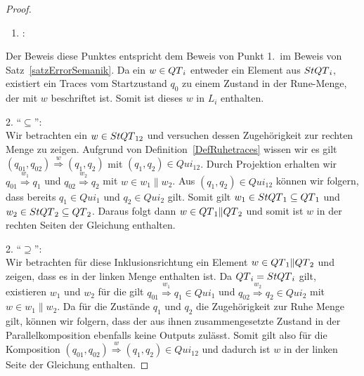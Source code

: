 \begin{proof}
  ~
  \begin{enumerate}
    \item \hspace{-0.2cm}:
  \end{enumerate}
  \vspace{-0.3cm}
  Der Beweis diese Punktes entspricht dem Beweis von Punkt 1.\ im Beweis von
  Satz~\ref{satzErrorSemanik}. Da ein $w\in QT{}_i$ entweder ein Element aus
  $StQT{}_i$, existiert ein Traces vom Startzustand $q_0$ zu einem Zustand in
  der Rune-Menge, der mit $w$ beschriftet ist. Somit ist dieses $w$ in $L_i$
  enthalten.

  2. ``$\subseteq$'':\\
  Wir betrachten ein
  $w\in StQT{}_{12}$ und versuchen dessen Zugehörigkeit zur rechten Menge zu
  zeigen. Aufgrund von Definition~\ref{DefRuhetraces} wissen wir es gilt
  $(q_{01},q_{02}) \overset{w}{\Rightarrow} (q_1,q_2)$ mit $(q_1,q_2)\in
  Qui_{12}$. Durch Projektion erhalten wir $q_{01} \overset{w_1}{\Rightarrow}
  q_1$ und $q_{02} \overset{w_2}{\Rightarrow} q_2$ mit $w\in w_1\|w_2$. Aus
  $(q_1,q_2)\in Qui_{12}$ können wir folgern, dass bereits $q_1\in Qui_1$ und
  $q_2\in Qui_2$ gilt. Somit gilt $w_1\in StQT{}_1\subseteq QT{}_1$ und
  $w_2\in StQT{}_2\subseteq QT{}_2$. Daraus folgt dann $w\in
  QT{}_1\|QT{}_2$ und somit ist $w$ in der rechten Seiten der Gleichung
  enthalten.

  2. ``$\supseteq$'':\\
  Wir betrachten für diese
  Inklusionsrichtung ein Element $w\in QT{}_1\|QT{}_2$ und zeigen, dass es in
  der linken Menge enthalten ist. Da $QT{}_i = StQT{}_i$ gilt, existieren
  $w_1$ und $w_2$ für die gilt $q_{01} \overset{w_1}{\Rightarrow} q_1\in Qui_1$
  und $q_{02} \overset{w_2}{\Rightarrow} q_2\in Qui_2$ mit $w\in w_1\| w_2$. Da
  für die Zustände $q_1$ und $q_2$ die Zugehörigkeit zur Ruhe Menge gilt,
  können wir folgern, dass der aus ihnen zusammengesetzte Zustand in der
  Parallelkomposition ebenfalls keine Outputs zulässt. Somit gilt also für die
  Komposition $(q_{01},q_{02}) \overset{w}{\Rightarrow} (q_1,q_2)\in Qui_{12}$
  und dadurch ist $w$ in der linken Seite der Gleichung enthalten.


\end{proof}
